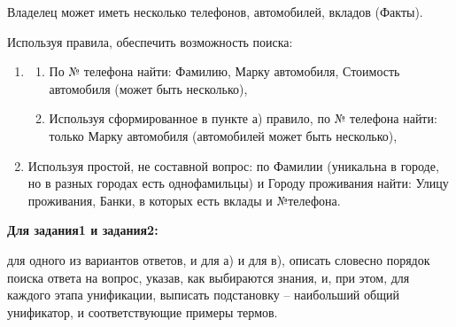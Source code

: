 \documentclass[12pt, a4paper]{extarticle}
\begin{document}
Владелец может иметь несколько телефонов, автомобилей, вкладов (Факты).

\hfill

Используя правила, обеспечить возможность поиска:

\begin{enumerate}
	\item 
	\begin{enumerate}
		\item По № телефона найти: Фамилию, Марку автомобиля, Стоимость автомобиля (может быть несколько),
		\item Используя сформированное в пункте а) правило, по № телефона найти: только Марку автомобиля (автомобилей может быть несколько),
	\end{enumerate}
	\item Используя простой, не составной вопрос: по Фамилии (уникальна в городе, но в разных городах есть однофамильцы) и Городу проживания найти:  Улицу проживания, Банки, в которых есть вклады и №телефона. 
\end{enumerate}

\textbf{Для задания1 и задания2: }

для одного из вариантов ответов, и для а) и для в), описать словесно порядок поиска ответа на вопрос, указав, как выбираются знания, и, при этом, для каждого этапа унификации, выписать подстановку – наибольший общий унификатор, и соответствующие примеры термов.
\end{document}
